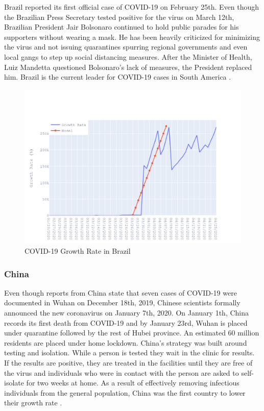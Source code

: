 \documentclass{homework}
\begin{document}
Brazil reported its first official case of COVID-19 on February 25th. Even though the Brazilian Press Secretary tested positive for the virus on March 12th, Brazilian President Jair Bolsonaro continued to hold public parades for his supporters without wearing a mask. He has been heavily criticized for minimizing the virus and not issuing quarantines spurring regional governments and even local gangs to step up social distancing measures. After the Minister of Health, Luiz Mandetta questioned Bolsonaro's lack of measures, the President replaced him. Brazil is the current leader for COVID-19 cases in South America \cite{thebrazilianreport}.

\begin{figure}[H]
  \centering
  \includegraphics[scale=0.3]{task3/Brazil.png}
  \caption{COVID-19 Growth Rate in Brazil}
\end{figure}

\newpage
\subsubsection{China}

Even though reports from China state that seven cases of COVID-19 were documented in Wuhan on December 18th, 2019, Chinese scientists formally announced the new coronavirus on January 7th, 2020. On January 1th, China records its first death from COVID-19 and by January 23rd, Wuhan is placed under quarantine followed by the rest of Hubei province. An estimated 60 million residents are placed under home lockdown. China's strategy was built around testing and isolation. While a person is tested they wait in the clinic for results. If the results are positive, they are treated in the facilities until they are free of the virus and individuals who were in contact with the person are asked to self-isolate for two weeks at home. As a result of effectively removing infectious individuals from the general population, China was the first country to lower their growth rate \cite{holly_secon_2020}.
\end{document}
